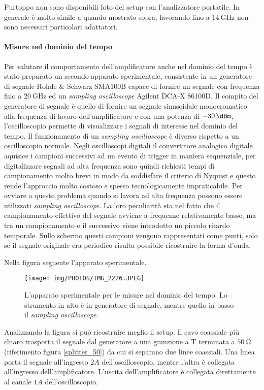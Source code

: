 \documentclass[12pt,oneside]{book}
\begin{document}
Purtoppo non sono disponibili foto del setup con l'analizzatore portatile. In generale è molto simile a quando mostrato sopra, lavorando fino a $\SI{14}{\giga\hertz}$ non sono necessari particolari adattatori.

\paragraph{Misure nel dominio del tempo}
Per valutare il comportamento dell'amplificatore anche nel dominio del tempo è stato preparato un secondo apparato sperimentale, consistente in un generatore di segnale Rohde \& Schwarz SMA100B capace di fornire un segnale con frequenza fino a $\SI{20}{\giga\hertz}$ ed un \textit{sampling oscilloscope} Agilent DCA-X 86100D.
Il compito del generatore di segnale è quello di fornire un segnale sinusoidale monocromatico alla frequenza di lavoro dell'amplificatore e con una potenza di $\SI{-30}{\dBm}$, l'oscilloscopio permette di visualizzare i segnali di interesse nel dominio del tempo.
Il funzionamento di un \textit{sampling oscilloscope} è diverso rispetto a un oscilloscopio normale. Negli oscilloscopi digitali il convertitore analogico digitale aquisice i campioni successivi ad un evento di trigger in maniera sequenziale, per digitalizzare segnali ad alta frequenza sono quindi richiesti tempi di campionamento molto brevi in modo da soddisfare il criterio di Nyquist e questo rende l'approccio molto costoso e spesso tecnologicamente impraticabile. Per ovviare a questo problema quando si lavora ad alta frequenza possono essere utilizzati \textit{sampling oscilloscope}. La loro peculiarità sta nel fatto che il campionamento effettivo del segnale avviene a frequenze relativamente basse, ma tra un campionamento e il successivo viene introdotto un piccolo ritardo temporale. Sullo schermo questi campioni vengono rappresentati come punti, solo se il segnale originale era periodico risulta possibile ricostruire la forma d'onda.

Nella figura seguente l'apparato sperimentale. 
\begin{figure}[!htbp]
    \centering
        \texttt{[image: img/PHOTOS/IMG\_2226.JPEG]}
        \caption{L'apparato sperimentale per le misure nel dominio del tempo. Lo strumento in alto è in generatore di segnale, mentre quello in basso il \textit{sampling oscilloscope}.}
\end{figure}
Analizzando la figura si può ricostruire meglio il setup. Il cavo coassiale più chiaro trasporta il segnale dal generatore a una giunzione a T terminata a $\SI{50}{\ohm}$ (riferimento figura \ref{splitter_50}) da cui si separano due linee coassiali. Una linea porta il segnale all'ingresso $2A$ dell'oscilloscopio, mentre l'altra è collegata all'ingresso dell'amplificatore. L'uscita dell'amplificatore è collegata direttamente al canale $1A$ dell'oscilloscopio.
\end{document}

